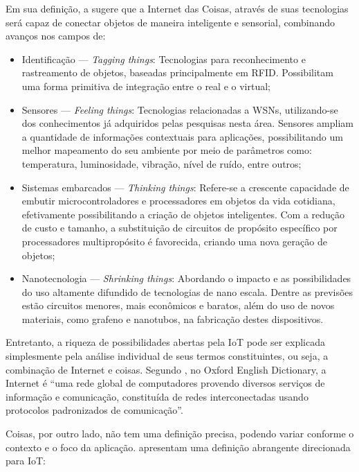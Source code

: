 \documentclass[twoside,english,brazilian]{UNISINOSmonografia}
\begin{document}
	Em sua definição, a  sugere que a Internet das 
	Coisas, através de suas tecnologias será capaz de conectar objetos de 
	maneira inteligente e sensorial, combinando avanços nos campos de:
	\begin{itemize}
		\item Identificação --- \textit{Tagging things}: Tecnologias para 
		reconhecimento e rastreamento de objetos, baseadas principalmente 
		em RFID. Possibilitam uma forma primitiva de integração entre o 
		real e o virtual;
		
		\item Sensores --- \textit{Feeling things}: Tecnologias 
		relacionadas a WSNs, utilizando-se dos conhecimentos já adquiridos 
		pelas pesquisas nesta área. Sensores ampliam a quantidade de 
		informações contextuais para aplicações, possibilitando um melhor 
		mapeamento do seu ambiente por meio de parâmetros como: 
		temperatura, luminosidade, vibração, nível de ruído, entre outros;
		
		\item Sistemas embarcados --- \textit{Thinking things}: Refere-se 
		a crescente capacidade de embutir microcontroladores e 	
		processadores em objetos da vida cotidiana, efetivamente 
		possibilitando a criação de objetos inteligentes. Com a redução de 
		custo e tamanho, a substituição de circuitos de propósito 
		específico por processadores multipropósito é favorecida, criando 
		uma nova geração de objetos;
		
		\item Nanotecnologia --- \textit{Shrinking things}: Abordando o 
		impacto e as possibilidades do uso altamente difundido de 
		tecnologias de nano escala. Dentre as previsões estão circuitos 
		menores, mais econômicos e baratos, além do uso de novos 
		materiais, como grafeno e nanotubos, na fabricação destes 
		dispositivos.
	\end{itemize}
	
	Entretanto, a riqueza de possibilidades abertas pela IoT pode ser 
	explicada simplesmente pela análise individual de seus termos 
	constituintes, ou seja, a combinação de Internet e coisas. Segundo 
	, no Oxford English Dictionary, a Internet é 
	``uma rede global de computadores provendo diversos serviços de 
	informação e comunicação, constituída de redes interconectadas usando 
	protocolos padronizados de comunicação''.
	
	Coisas, por outro lado, não tem uma definição precisa, podendo variar 
	conforme o contexto e o foco da aplicação.  
	apresentam uma definição abrangente direcionada para IoT:
	
\end{document}
